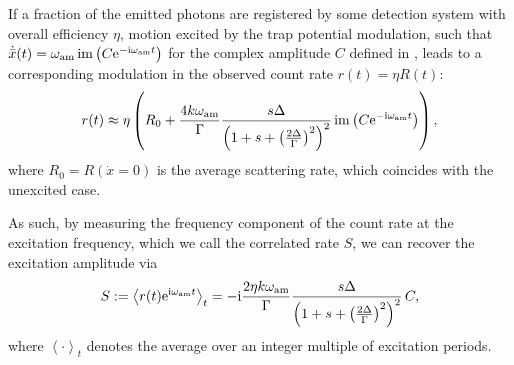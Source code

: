 \documentclass[pra,twocolumn]{revtex4-2}
\begin{document}
\label{sec:detecting-motion}

If a fraction of the emitted photons are registered by some detection system with overall efficiency $\eta$, motion excited by the trap potential modulation, such that $\dot{\bar{x}}(t) = \omega_{\textrm{am}} \operatorname{im}\left(C \mathrm{e}^{-\mathrm{i} \omega_{\textrm{am}} t}\right)$ for the complex amplitude $C$ defined in , leads to a corresponding modulation in the observed count rate $r(t) = \eta R(t)$:
\begin{equation}
	r(t) \approx  \eta \left(R_0 + \frac{4 k \omega_{\textrm{am}}}{\Gamma} \frac{s \Delta}{\left(1 + s + \left(\frac{2\Delta}{\Gamma}\right)^2\right)^2} \operatorname{im}\left(C \mathrm{e}^{-\mathrm{i} \omega_{\textrm{am}} t}\right)\right),
	\label{eq:correlated-rate-model}
\end{equation}
where $R_0 = R(\dot{x} = 0)$ is the average scattering rate, which coincides with the unexcited case.

As such, by measuring the frequency component of the count rate at the excitation frequency, which we call the correlated rate $S$, we can recover the excitation amplitude via
\begin{equation}
	S := \left\langle r(t) \mathrm{e}^{\mathrm{i} \omega_{\textrm{am}} t} \right\rangle_t =
	-\mathrm{i} \frac{2 \eta k \omega_{\textrm{am}}}{\Gamma} \frac{s \Delta}{\left(1 + s + \left(\frac{2\Delta}{\Gamma}\right)^2\right)^2}\, C,
	\label{eq:correlated-rate-demod}
\end{equation}
where $\left\langle \cdot \right\rangle_t$ denotes the average over an integer multiple of excitation periods.
\end{document}
